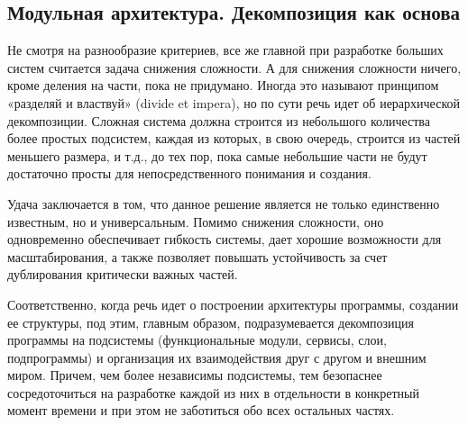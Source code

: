 \documentclass[a4paper]{article}
\begin{document}
\subsection{Модульная архитектура. Декомпозиция как основа}

\begin{figure}[h]
\end{figure}


Не смотря на разнообразие критериев, все же главной при разработке больших систем считается задача снижения сложности. А для снижения сложности ничего, кроме деления на части, пока не придумано. Иногда это называют принципом «разделяй и властвуй» (divide et impera), но по сути речь идет об иерархической декомпозиции. Сложная система должна строится из небольшого количества более простых подсистем, каждая из которых, в свою очередь, строится из частей меньшего размера, и т.д., до тех пор, пока самые небольшие части не будут достаточно просты для непосредственного понимания и создания.

Удача заключается в том, что данное решение является не только единственно известным, но и универсальным. Помимо снижения сложности, оно одновременно обеспечивает гибкость системы, дает хорошие возможности для масштабирования, а также позволяет повышать устойчивость за счет дублирования критически важных частей.

Соответственно, когда речь идет о построении архитектуры программы, создании ее структуры, под этим, главным образом, подразумевается декомпозиция программы на подсистемы (функциональные модули, сервисы, слои, подпрограммы) и организация их взаимодействия друг с другом и внешним миром. Причем, чем более независимы подсистемы, тем безопаснее сосредоточиться на разработке каждой из них в отдельности в конкретный момент времени и при этом не заботиться обо всех остальных частях.
\end{document}
